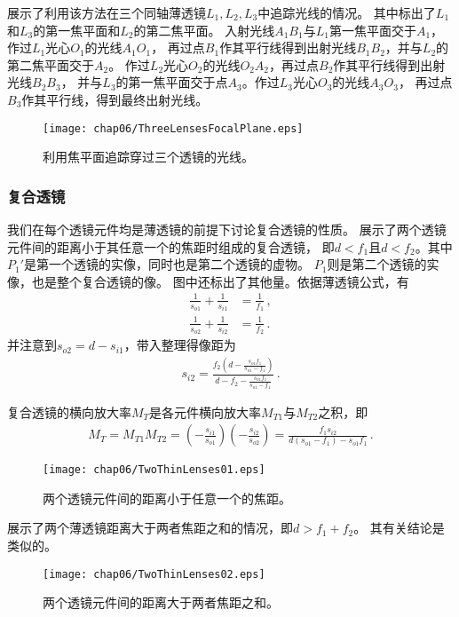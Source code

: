 展示了利用该方法在三个同轴薄透镜$L_1,L_2,L_3$中追踪光线的情况。
其中标出了$L_1$和$L_3$的第一焦平面和$L_2$的第二焦平面。
入射光线$A_1B_1$与$L_1$第一焦平面交于$A_1$，作过$L_1$光心$O_1$的光线$A_1O_1$，
再过点$B_1$作其平行线得到出射光线$B_1B_2$，并与$L_2$的第二焦平面交于$A_2$。
作过$L_2$光心$O_2$的光线$O_2A_2$，再过点$B_2$作其平行线得到出射光线$B_2B_3$，
并与$L_3$的第一焦平面交于点$A_3$。作过$L_3$光心$O_3$的光线$A_3O_3$，
再过点$B_3$作其平行线，得到最终出射光线。
\begin{figure}[htbp]
    \centering\texttt{[image: chap06/ThreeLensesFocalPlane.eps]}
    \caption{利用焦平面追踪穿过三个透镜的光线。}
    \label{fig:6.44}
\end{figure}

\subsubsection{复合透镜}
我们在每个透镜元件均是薄透镜的前提下讨论复合透镜的性质。
展示了两个透镜元件间的距离小于其任意一个的焦距时组成的复合透镜，
即$d<f_1$且$d<f_2$。其中$P_1'$是第一个透镜的实像，同时也是第二个透镜的虚物。
$P_1$则是第二个透镜的实像，也是整个复合透镜的像。
图中还标出了其他量。依据薄透镜公式，有
\begin{align}
    \frac{1}{s_{o1}}+\frac{1}{s_{i1}} & =\frac{1}{f_1}\, , \\
    \frac{1}{s_{o2}}+\frac{1}{s_{i2}} & =\frac{1}{f_2}\, .
\end{align}
并注意到$s_{o2}=d-s_{i1}$，带入整理得像距为
\begin{align}
    s_{i2}=\frac{f_2\left(d-\displaystyle\frac{s_{o1}f_1}{s_{o1}-f_1}\right)}{d-f_2-\displaystyle\frac{s_{o1}f_1}{s_{o1}-f_1}}\, .
\end{align}

复合透镜的横向放大率$M_T$是各元件横向放大率$M_{T1}$与$M_{T2}$之积，即
\begin{align}
    M_T=M_{T1}M_{T2}=\left(-\frac{s_{i1}}{s_{o1}}\right)\left(-\frac{s_{i2}}{s_{o2}}\right)=\frac{f_1s_{i2}}{d(s_{o1}-f_1)-s_{o1}f_1}\, .
\end{align}
\begin{figure}[htbp]
    \centering\texttt{[image: chap06/TwoThinLenses01.eps]}
    \caption{两个透镜元件间的距离小于任意一个的焦距。}
    \label{fig:6.45}
\end{figure}

展示了两个薄透镜距离大于两者焦距之和的情况，即$d>f_1+f_2$。
其有关结论是类似的。
\begin{figure}[htbp]
    \centering\texttt{[image: chap06/TwoThinLenses02.eps]}
    \caption{两个透镜元件间的距离大于两者焦距之和。}
    \label{fig:6.46}
\end{figure}


